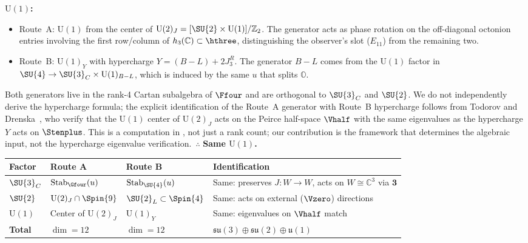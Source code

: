 \medskip
\noindent\textbf{$\mathrm{U}(1)$:}
\begin{itemize}
  \item Route~A: $\mathrm{U}(1)$ from the center of
    $\mathrm{U}(2)_J = [\SU{2}\times\mathrm{U}(1)]/\mathbb{Z}_2$.
    The generator acts as phase rotation on the off-diagonal
    octonion entries involving the first row/column of
    $h_3(\mathbb{C})\subset\hthree$, distinguishing the observer's
    slot ($E_{11}$) from the remaining two.
  \item Route~B: $\mathrm{U}(1)_Y$ with hypercharge
    $Y = (B\!-\!L) + 2J_3^R$.  The generator $B\!-\!L$
    comes from the $\mathrm{U}(1)$ factor in
    $\SU{4}\to\SU{3}_C\times\mathrm{U}(1)_{B-L}$, which is
    induced by the same $u$ that splits $\mathbb{O}$.
\end{itemize}
Both generators live in the rank-4 Cartan subalgebra of $\Ffour$
and are orthogonal to $\SU{3}_C$ and $\SU{2}$.  We do not independently derive the hypercharge formula; the explicit
identification of the Route~A generator with Route~B hypercharge
follows from Todorov and Drenska~\cite{TodorovDrenska2018}, who
verify that the $\mathrm{U}(1)$ center of $\mathrm{U}(2)_J$ acts
on the Peirce half-space $\Vhalf$ with the same eigenvalues as the
hypercharge $Y$ acts on $\Stenplus$.  This is a computation in
\cite{TodorovDrenska2018}, not just a rank count; our contribution
is the framework that determines the algebraic input, not the
hypercharge eigenvalue verification.\ $\therefore$
\textbf{Same $\mathrm{U}(1)$.}

\begin{center}
\small
\renewcommand{\arraystretch}{1.2}
\begin{tabular}{@{}lllp{4.5cm}@{}}
  \toprule
  Factor & Route A & Route B & Identification \\
  \midrule
  $\SU{3}_C$ & $\mathrm{Stab}_{\Gfour}(u)$ & $\mathrm{Stab}_{\SU{4}}(u)$
    & Same: preserves $J\colon W\to W$, acts on $W\cong\mathbb{C}^3$ via $\mathbf{3}$ \\
  $\SU{2}$ & $\mathrm{U}(2)_J\cap\Spin{9}$ & $\SU{2}_L\subset\Spin{4}$
    & Same: acts on external ($\Vzero$) directions \\
  $\mathrm{U}(1)$ & Center of $\mathrm{U}(2)_J$ & $\mathrm{U}(1)_Y$
    & Same: eigenvalues on $\Vhalf$ match~\cite{TodorovDrenska2018} \\
  \midrule
  \textbf{Total} & $\dim = 12$ & $\dim = 12$
    & $\mathfrak{su}(3)\oplus\mathfrak{su}(2)\oplus\mathfrak{u}(1)$ \\
  \bottomrule
\end{tabular}
\end{center}

